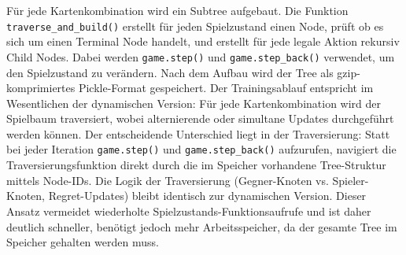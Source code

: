 Für jede Kartenkombination wird ein Subtree aufgebaut.
Die Funktion \texttt{traverse\_and\_build()} erstellt für jeden Spielzustand einen Node, prüft ob es sich um einen Terminal Node handelt, und erstellt für jede legale Aktion rekursiv Child Nodes.
Dabei werden \texttt{game.step()} und \texttt{game.step\_back()} verwendet, um den Spielzustand zu verändern.
Nach dem Aufbau wird der Tree als gzip-komprimiertes Pickle-Format gespeichert.
Der Trainingsablauf entspricht im Wesentlichen der dynamischen Version: Für jede Kartenkombination wird der Spielbaum traversiert, wobei alternierende oder simultane Updates durchgeführt werden können.
Der entscheidende Unterschied liegt in der Traversierung: Statt bei jeder Iteration \texttt{game.step()} und \texttt{game.step\_back()} aufzurufen, navigiert die Traversierungsfunktion direkt durch die im Speicher vorhandene Tree-Struktur mittels Node-IDs.
Die Logik der Traversierung (Gegner-Knoten vs. Spieler-Knoten, Regret-Updates) bleibt identisch zur dynamischen Version.
Dieser Ansatz vermeidet wiederholte Spielzustands-Funktionsaufrufe und ist daher deutlich schneller, benötigt jedoch mehr Arbeitsspeicher, da der gesamte Tree im Speicher gehalten werden muss.
\newpage

